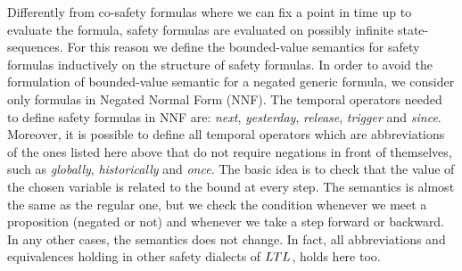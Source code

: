 Differently from co-safety formulas where we can fix a point in time up to evaluate the formula, safety formulas are evaluated on possibly infinite state-sequences.
For this reason we define the bounded-value semantics for safety formulas inductively on the structure of safety formulas.
In order to avoid the formulation of bounded-value semantic for a negated generic formula, we consider only formulas in Negated Normal Form (NNF). 
The temporal operators needed to define safety formulas in NNF are: \textit{next}, \textit{yesterday}, \textit{release}, \textit{trigger} and \textit{since}.
Moreover, it is possible to define all temporal operators which are abbreviations of the ones listed here above that do not require negations in front of themselves, such as \textit{globally}, \textit{historically} and \textit{once}.
The basic idea is to check that the value of the chosen variable is related to the bound at every step.
The semantics is almost the same as the regular one, but we check the condition whenever we meet a proposition (negated or not) and whenever we take a step forward or backward.
In any other cases, the semantics does not change.
In fact, all abbreviations and equivalences holding in other safety dialects of $LTL$, holds here too.

